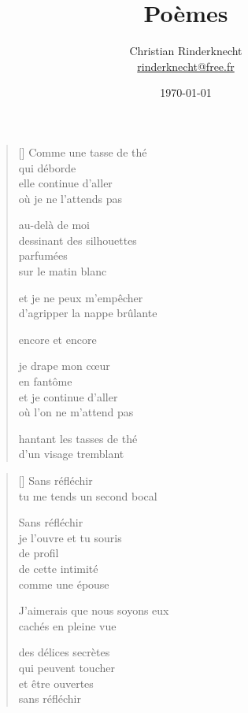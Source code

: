 \documentclass[12pt,a4paper]{article}
\title{Poèmes}
\author{Christian Rinderknecht\\
{\small \url{rinderknecht@free.fr}}}
\date{\today}
\begin{document}
\maketitle

\thispagestyle{empty}

\newpage\leavevmode\thispagestyle{empty}\newpage


\newpage

\poemtitle{}

\settowidth{\versewidth}{d'agripper le nappe brûlante}

\bigskip

\begin{verse}[\versewidth]
  Comme une tasse de thé \\
  qui déborde \\

  elle continue d'aller \\
  où je ne l'attends pas

  au-delà de moi \\
  dessinant des silhouettes \\
  parfumées \\
  sur le matin blanc

  et je ne peux m'empêcher \\
  d'agripper la nappe brûlante

  encore et encore

  je drape mon cœur \\
  en fantôme \\
  et je continue d'aller \\
  où l'on ne m'attend pas

  hantant les tasses de thé \\
  d'un visage tremblant
\end{verse}


\newpage

\poemtitle{}

\settowidth{\versewidth}{J'aimerais que nous soyons eux}

\bigskip

\begin{verse}[\versewidth]
  Sans réfléchir \\
  tu me tends un second bocal

  Sans réfléchir \\
  je l'ouvre et tu souris \\
  de profil \\
  de cette intimité \\
  comme une épouse

  J'aimerais que nous soyons eux \\

  cachés en pleine vue

  des délices secrètes \\
  qui peuvent toucher \\
  et être ouvertes \\
  sans réfléchir
\end{verse}
\end{document}

